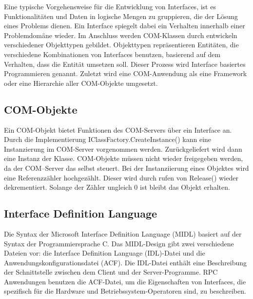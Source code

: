 Eine typische Vorgehensweise für die Entwicklung von Interfaces, ist es Funktionalitäten und Daten in logische Mengen zu gruppieren, die der Lösung eines Problems dienen. Ein Interface spiegelt dabei ein Verhalten innerhalb einer Problemdomäne wieder. Im Anschluss werden COM-Klassen durch entwickeln verschiedener Objekttypen gebildet. Objekttypen repräsentieren Entitäten, die verschiedene Kombinationen von Interfaces benutzen, basierend auf dem Verhalten, dass die Entität umsetzen soll. Dieser Prozess wird Interface basiertes Programmieren genannt. Zuletzt wird eine COM-Anwendung als eine Framework oder eine Hierarchie aller COM-Objekte umgesetzt.

\subsection{COM-Objekte}
\label{ch:grundlagen:sec:ComponentObjectModel:subsec:COMObjekte}

Ein COM-Objekt bietet Funktionen des COM-Servers über ein Interface an. Durch die Implementierung IClassFactory.CreateInstance() kann eine Instanzierung im COM-Server vorgenommen werden. Zurückgeliefert wird dann eine Instanz der Klasse. COM-Objekte müssen nicht wieder freigegeben werden, da der COM–Server das selbst steuert. Bei der Instanziierung eines Objektes  wird eine Referenzzähler hochgezählt. Dieser wird durch rufen von Release() wieder dekrementiert. Solange der Zähler ungleich 0 ist bleibt das Objekt erhalten. 

\subsection{Interface Definition Language}
\label{ch:grundlagen:sec:ComponentObjectModel:subsec:InterfaceDefinitionLanguage}

Die Syntax der Microsoft Interface Definition Language (MIDL) basiert auf der Syntax der Programmiersprache C. Das MIDL-Design gibt zwei verschiedene Dateien vor: die Interface Definition Language (IDL)-Datei und die Anwendungskonfigurationsdatei (ACF). Die IDL-Datei enthält eine Beschreibung der Schnittstelle zwischen dem Client und der Server-Programme. RPC Anwendungen benutzen die ACF-Datei, um die Eigenschaften von Interfaces, die spezifisch für die Hardware und Betriebssystem-Operatoren sind, zu beschreiben.